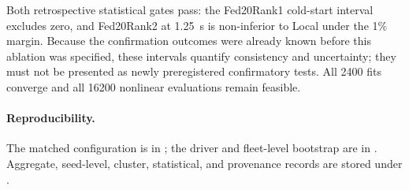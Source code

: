 Both retrospective statistical gates pass: the Fed20Rank1 cold-start interval
excludes zero, and Fed20Rank2 at 1.25~s is non-inferior to Local under the 1\%
margin. Because the confirmation outcomes were already known before this
ablation was specified, these intervals quantify consistency and uncertainty;
they must not be presented as newly preregistered confirmatory tests. All 2400
fits converge and all 16200 nonlinear evaluations remain feasible.

\paragraph{Reproducibility.}
The matched configuration is in ; the
driver and fleet-level bootstrap are in
. Aggregate, seed-level,
cluster, statistical, and provenance records are stored under
.
